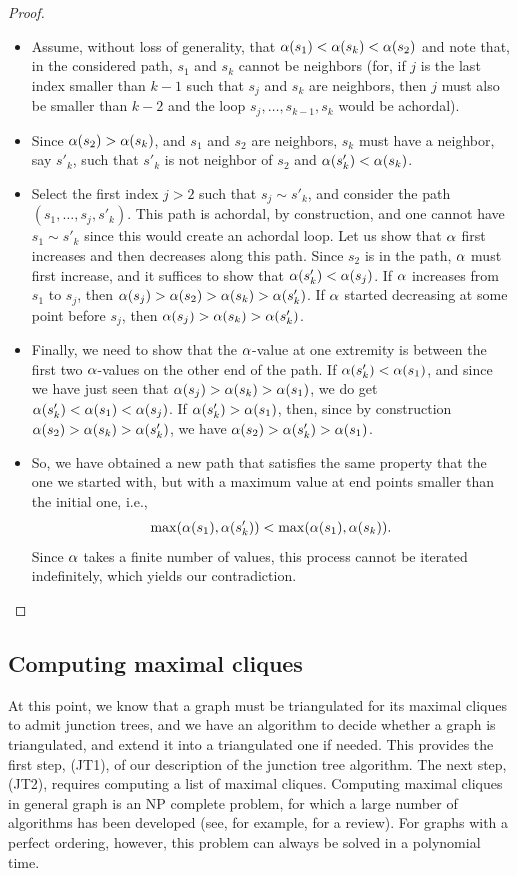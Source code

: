 \begin{proof}
\begin{itemize}
\item Assume, without loss of generality, that $\alpha(s_1) < \alpha(s_k) <
\alpha(s_2)$ and note that, in the considered path, $s_1$ and $s_k$ cannot be
neighbors (for, if $j$ is the last index smaller than $k-1$ such that $s_j$ and $s_k$
are neighbors, then $j$ must also be smaller than $k-2$ and the loop $s_j, \ldots, s_{k-1}, s_k$ would be achordal). 
\item Since
$\alpha(s_2) > \alpha(s_k)$, and $s_1$ and $s_2$ are neighbors, $s_k$ must
have a neighbor, say $s'_k$, such
that $s'_k$ is not neighbor of $s_2$ and $\alpha(s'_k) < \alpha(s_k)$. 
\item Select the first index $j>2$ such that $s_j \sim s'_{k}$, and consider
the path $(s_1, \ldots, s_j, s'_k)$. This path is achordal, by
construction, and one cannot have $s_1 \sim s'_k$ since this would
create an achordal loop. Let us show that $\alpha$ first increases and then decreases
along this path. Since $s_2$ is in the path, $\alpha$ must first
increase, and it suffices to show that $\alpha(s'_k) < \alpha(s_j)$. If
$\alpha$ increases from $s_1$ to $s_j$, then $\alpha(s_j) > \alpha(s_2) >
\alpha(s_k) > \alpha(s'_k)$. If $\alpha$ started decreasing at some point
before $s_j$, then $\alpha(s_j) > \alpha(s_k) > \alpha(s'_k)$. 
\item Finally, we need
to show that the $\alpha$-value at one extremity is between the first two
$\alpha$-values on the other end of the path. If $\alpha(s'_k) < \alpha(s_1)$,
and since we have just seen that $\alpha(s_j) >\alpha(s_k) > \alpha(s_1)$, we
do get $\alpha(s'_k) < \alpha(s_1) < \alpha(s_j)$. If $\alpha(s'_k) > \alpha(s_1)$,
then, since by construction $\alpha(s_2) > \alpha(s_k) > \alpha(s'_k)$, we have
$\alpha(s_2) > \alpha(s'_k) > \alpha(s_1)$. 
\item So, we have obtained a new path
that satisfies the same property that the one we started with, but
with a maximum value at end points smaller than the initial one, i.e.,
\[
\max(\alpha(s_1), \alpha(s'_k)) < \max(\alpha(s_1), \alpha(s_k)).
\]
Since $\alpha$ takes a finite number of values, this process cannot be
iterated indefinitely, which yields our contradiction.
\end{itemize} 
\end{proof}

\subsection{Computing maximal cliques}
At this point, we know that a graph must be triangulated for its
maximal cliques to admit junction trees, and we have an algorithm to
decide whether a graph is triangulated, and extend it into a
triangulated one if needed. This provides the first step, (JT1), of
our description of the junction tree algorithm. The next step, (JT2),
requires computing a list of maximal cliques. Computing maximal cliques in general graph is an NP complete problem,
for which a large number of algorithms has been developed (see, for
example, \cite{pardalos1994maximum} for a review). For graphs with a
perfect ordering,
however, this problem can always be solved in a polynomial
time. 

